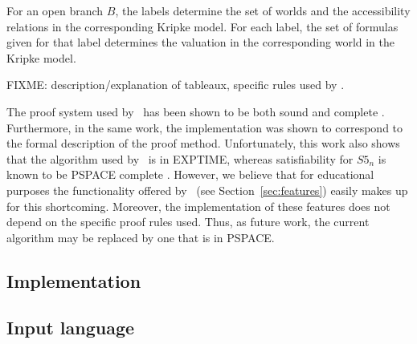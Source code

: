For an open branch $B$, the labels determine the set of worlds and the
accessibility relations in the corresponding Kripke model. For each label, the
set of formulas given for that label determines the valuation in the
corresponding world in the Kripke model.

FIXME: description/explanation of tableaux, specific rules used by \oops.



The proof system used by \oops\ has been shown to be both sound and complete
\citep{valkenhoef2008}.  Furthermore, in the same work, the implementation was
shown to correspond to the formal description of the proof method.
Unfortunately, this work also shows that the algorithm used by \oops\ is in
{\sc EXPTIME}, whereas satisfiability for $S5_n$ is known to be {\sc PSPACE}
complete \citep{halpern1992}.
However, we believe that for educational purposes the functionality  offered
by \oops\ (see Section~\ref{sec:features}) easily makes up for this
shortcoming. Moreover, the implementation of these features does not depend on
the specific proof rules used. Thus, as future work, the current algorithm may
be replaced by one that is in {\sc PSPACE}.

\subsection{Implementation}

\subsection{Input language}
